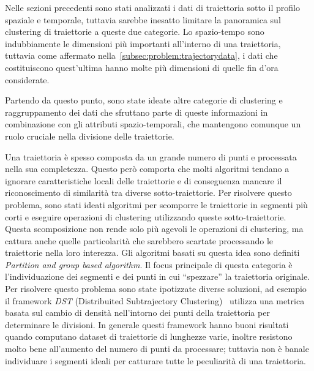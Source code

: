 Nelle sezioni precedenti sono stati analizzati i dati di traiettoria sotto il profilo
spaziale e temporale, tuttavia sarebbe inesatto limitare la panoramica sul clustering di traiettorie
a queste due categorie.
Lo spazio-tempo sono indubbiamente le dimensioni più importanti all'interno di una traiettoria,
tuttavia come affermato nella~\cref{subsec:problem:trajectorydata},
i dati che costituiscono quest'ultima hanno molte più dimensioni di quelle fin d'ora considerate.

Partendo da questo punto, sono state ideate altre categorie di clustering e raggruppamento dei dati
che sfruttano parte di queste informazioni in combinazione con gli attributi spazio-temporali,
che mantengono comunque un ruolo cruciale nella divisione delle traiettorie.

Una traiettoria è spesso composta da un grande numero di punti e processata nella sua completezza.
Questo però comporta che molti algoritmi tendano a ignorare caratteristiche locali delle traiettorie
e di conseguenza mancare il riconoscimento di similarità tra diverse sotto-traiettorie.
Per risolvere questo problema, sono stati ideati algoritmi per scomporre le traiettorie in segmenti più corti
e eseguire operazioni di clustering utilizzando queste sotto-traiettorie.
Questa scomposizione non rende solo più agevoli le operazioni di clustering, ma cattura anche
quelle particolarità che sarebbero scartate processando le traiettorie nella loro interezza.
Gli algoritmi basati su questa idea sono definiti \textit{Partition and group based algorithm}.
Il focus principale di questa categoria è l'individuazione dei segmenti e
dei punti in cui ``spezzare'' la traiettoria originale.
Per risolvere questo problema sono state ipotizzate diverse soluzioni,
ad esempio il framework \textit{DST} (Distribuited Subtrajectory Clustering)~\cite{tampakis2019scalable} utilizza una metrica basata
sul cambio di densità nell'intorno dei punti della traiettoria per determinare le divisioni.
In generale questi framework hanno buoni risultati quando computano dataset di traiettorie
di lunghezze varie, inoltre resistono molto bene all'aumento del numero di punti da processare;
tuttavia non è banale individuare i segmenti ideali per catturare tutte le peculiarità
di una traiettoria.

